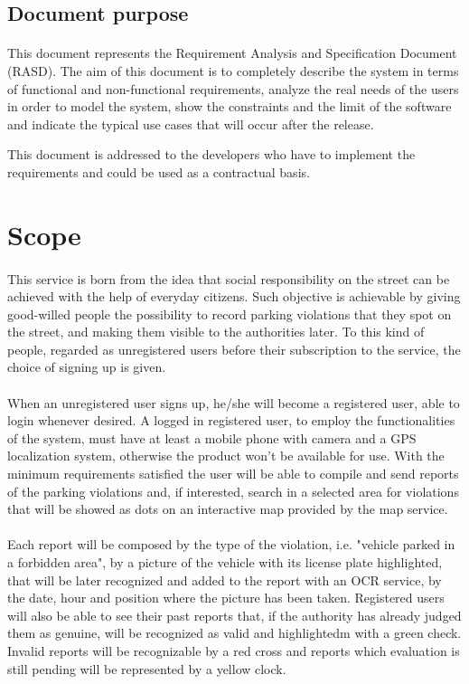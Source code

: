 			\subsection{Document purpose}
				\paragraph{}
					This document represents the Requirement Analysis and Specification Document (RASD). The aim of this document is to completely describe the system in terms of functional and non-functional requirements, analyze the real needs of the users in order to model the system, show the constraints and the limit of the software and indicate the typical use cases that will occur after the release. 
					
					This document is addressed to the developers who have to implement the requirements and could be used as a contractual basis.
		\section{Scope}
			\paragraph{}
				This service is born from the idea that social responsibility on the street can be achieved with the help of everyday citizens. Such objective is achievable by giving good-willed people the possibility to record parking violations that they spot on the street, and making them visible to the authorities later. To this kind of people, regarded as unregistered users before their subscription to the service, the choice of signing up is given. 
				
			\paragraph{}
				When an unregistered user signs up, he/she will become a registered user, able to login whenever desired. A logged in registered user, to employ the functionalities of the system, must have at least a mobile phone with camera and a GPS localization system, otherwise the product won't be available for use. With the minimum requirements satisfied the user will be able to compile and send reports of the parking violations and, if interested, search in a selected area for violations that will be showed as dots on an interactive map provided by the map service. 
			\paragraph{}
				Each report will be composed by the type of the violation, i.e. "vehicle parked in a forbidden area", by a picture of the vehicle with its license plate highlighted, that will be later recognized and added to the report with an OCR service, by the date, hour and position where the picture has been taken. Registered users will also be able to see their past reports that, if the authority has already judged them as genuine, will be recognized as valid and highlightedm with a green check. Invalid reports will be recognizable by a red cross and reports which evaluation is still pending will be represented by a yellow clock.

